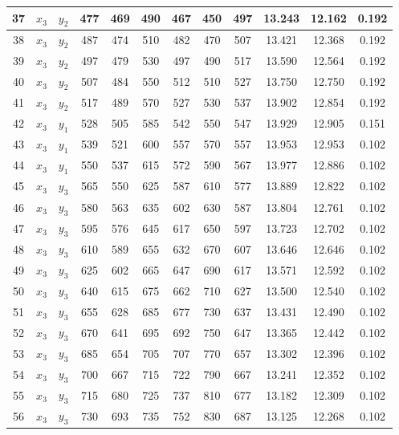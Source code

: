 \begin{longtable}[H]{c|c|c|c|c|c|c|c|c|c|c|c|}
    37 & $x_3$ & $y_2$ & 477 & 469 & 490 & 467 & 450 & 497 & 13.243 & 12.162 & 0.192 \\ \hline
    38 & $x_3$ & $y_2$ & 487 & 474 & 510 & 482 & 470 & 507 & 13.421 & 12.368 & 0.192 \\ \hline
    39 & $x_3$ & $y_2$ & 497 & 479 & 530 & 497 & 490 & 517 & 13.590 & 12.564 & 0.192 \\ \hline
    40 & $x_3$ & $y_2$ & 507 & 484 & 550 & 512 & 510 & 527 & 13.750 & 12.750 & 0.192 \\ \hline
    41 & $x_3$ & $y_2$ & 517 & 489 & 570 & 527 & 530 & 537 & 13.902 & 12.854 & 0.192 \\ \hline
    42 & $x_3$ & $y_1$ & 528 & 505 & 585 & 542 & 550 & 547 & 13.929 & 12.905 & 0.151 \\ \hline
    43 & $x_3$ & $y_1$ & 539 & 521 & 600 & 557 & 570 & 557 & 13.953 & 12.953 & 0.102 \\ \hline
    44 & $x_3$ & $y_1$ & 550 & 537 & 615 & 572 & 590 & 567 & 13.977 & 12.886 & 0.102 \\ \hline
    45 & $x_3$ & $y_3$ & 565 & 550 & 625 & 587 & 610 & 577 & 13.889 & 12.822 & 0.102 \\ \hline
    46 & $x_3$ & $y_3$ & 580 & 563 & 635 & 602 & 630 & 587 & 13.804 & 12.761 & 0.102 \\ \hline
    47 & $x_3$ & $y_3$ & 595 & 576 & 645 & 617 & 650 & 597 & 13.723 & 12.702 & 0.102 \\ \hline
    48 & $x_3$ & $y_3$ & 610 & 589 & 655 & 632 & 670 & 607 & 13.646 & 12.646 & 0.102 \\ \hline
    49 & $x_3$ & $y_3$ & 625 & 602 & 665 & 647 & 690 & 617 & 13.571 & 12.592 & 0.102 \\ \hline
    50 & $x_3$ & $y_3$ & 640 & 615 & 675 & 662 & 710 & 627 & 13.500 & 12.540 & 0.102 \\ \hline
    51 & $x_3$ & $y_3$ & 655 & 628 & 685 & 677 & 730 & 637 & 13.431 & 12.490 & 0.102 \\ \hline
    52 & $x_3$ & $y_3$ & 670 & 641 & 695 & 692 & 750 & 647 & 13.365 & 12.442 & 0.102 \\ \hline
    53 & $x_3$ & $y_3$ & 685 & 654 & 705 & 707 & 770 & 657 & 13.302 & 12.396 & 0.102 \\ \hline
    54 & $x_3$ & $y_3$ & 700 & 667 & 715 & 722 & 790 & 667 & 13.241 & 12.352 & 0.102 \\ \hline
    55 & $x_3$ & $y_3$ & 715 & 680 & 725 & 737 & 810 & 677 & 13.182 & 12.309 & 0.102 \\ \hline
    56 & $x_3$ & $y_3$ & 730 & 693 & 735 & 752 & 830 & 687 & 13.125 & 12.268 & 0.102 \\ \hline

\end{longtable}
